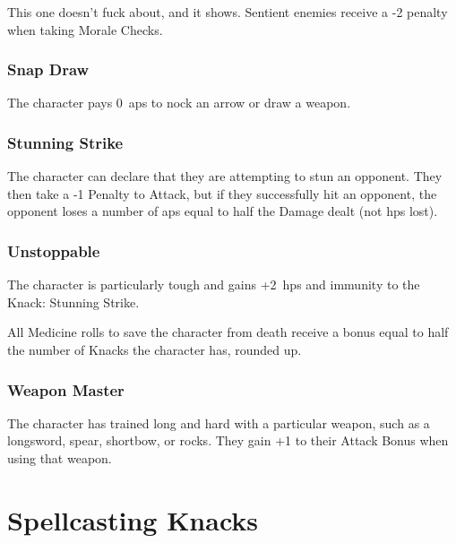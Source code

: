 \begin{multicols}{2}
This one doesn't fuck about, and it shows.
Sentient enemies receive a -2 penalty when taking Morale Checks.%

\subsubsection{Snap Draw}

The character pays 0~\glspl{ap} to nock an arrow or draw a weapon.

\subsubsection{Stunning Strike}\label{stunningstrike}

The character can declare that they are attempting to stun an opponent.
They then take a -1 Penalty to Attack, but if they successfully hit an opponent, the opponent loses a number of \glspl{ap} equal to half the Damage dealt (not \glspl{hp} lost).

\subsubsection{Unstoppable}

The character is particularly tough and gains +2~\glspl{hp} and immunity to the Knack: Stunning Strike.

All Medicine rolls to save the character from death receive a bonus equal to half the number of Knacks the character has, rounded up.

\subsubsection{Weapon Master}

The character has trained long and hard with a particular weapon, such as a longsword, spear, shortbow, or rocks.
They gain +1 to their Attack Bonus when using that weapon.

\end{multicols}

\section{Spellcasting Knacks}


